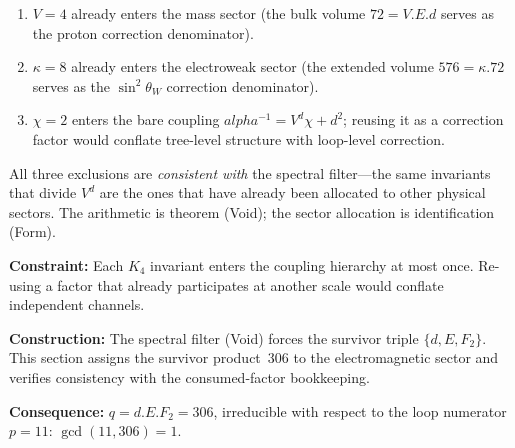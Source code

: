 \documentclass[11pt,a4paper]{book}
\def\alpha{alpha}%
\def\cdot{.}%
\begin{document}
\begin{enumerate}
\item $V = 4$ already enters the mass sector (the bulk volume
      $72 = V \cdot E \cdot d$ serves as the proton correction denominator).
\item $\kappa = 8$ already enters the electroweak sector (the extended
      volume $576 = \kappa \cdot 72$ serves as the $\sin^2\!\theta_W$
      correction denominator).
\item $\chi = 2$ enters the bare coupling $\alpha^{-1} = V^d \chi + d^2$;
      reusing it as a correction factor would conflate tree-level structure
      with loop-level correction.
\end{enumerate}
All three exclusions are \emph{consistent with} the spectral filter---the
same invariants that divide $V^d$ are the ones that have already been
allocated to other physical sectors.  The arithmetic is theorem
(Void); the sector allocation is identification (Form).

\medskip
\noindent
\textbf{Constraint:}
Each $K_4$ invariant enters the coupling hierarchy at most once.  Re-using a
factor that already participates at another scale would conflate independent
channels.

\noindent
\textbf{Construction:}
The spectral filter (Void) forces the survivor triple $\{d, E, F_2\}$.  This
section assigns the survivor product~$306$ to the electromagnetic sector and
verifies consistency with the consumed-factor bookkeeping.

\noindent
\textbf{Consequence:}
$q = d \cdot E \cdot F_2 = 306$, irreducible with respect to the loop
numerator $p = 11$: $\gcd(11, 306) = 1$.
\end{document}
